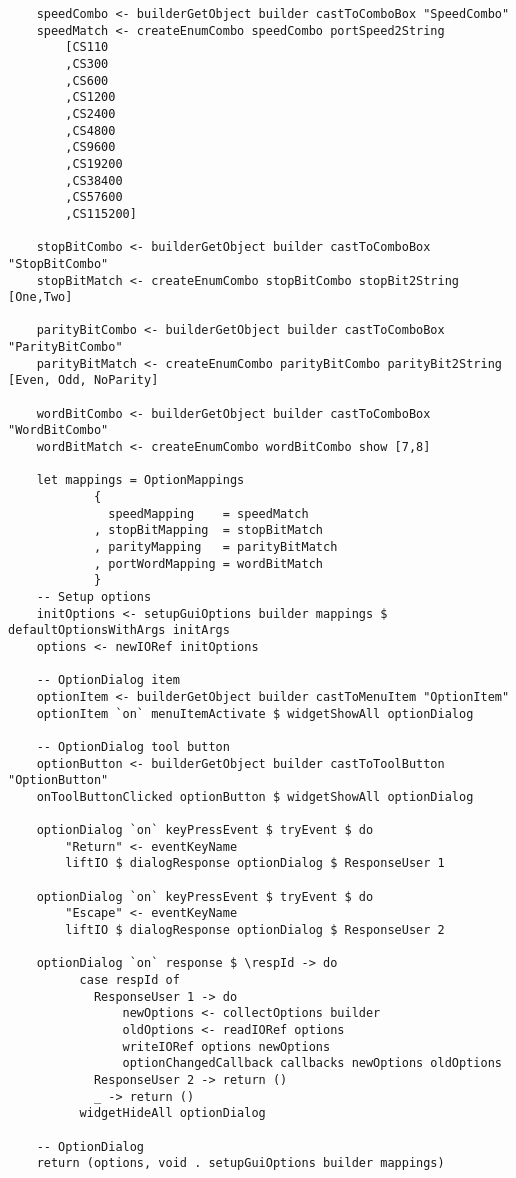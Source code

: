 \documentclass[russian,utf8,simple,emptystyle]{eskdtext}
\begin{document}
\begin{lstlisting}
    speedCombo <- builderGetObject builder castToComboBox "SpeedCombo"
    speedMatch <- createEnumCombo speedCombo portSpeed2String
        [CS110
        ,CS300
        ,CS600
        ,CS1200
        ,CS2400
        ,CS4800
        ,CS9600
        ,CS19200
        ,CS38400
        ,CS57600
        ,CS115200]

    stopBitCombo <- builderGetObject builder castToComboBox "StopBitCombo"
    stopBitMatch <- createEnumCombo stopBitCombo stopBit2String [One,Two]

    parityBitCombo <- builderGetObject builder castToComboBox "ParityBitCombo"
    parityBitMatch <- createEnumCombo parityBitCombo parityBit2String [Even, Odd, NoParity]

    wordBitCombo <- builderGetObject builder castToComboBox "WordBitCombo"
    wordBitMatch <- createEnumCombo wordBitCombo show [7,8]

    let mappings = OptionMappings
            {
              speedMapping    = speedMatch
            , stopBitMapping  = stopBitMatch
            , parityMapping   = parityBitMatch
            , portWordMapping = wordBitMatch
            } 
    -- Setup options
    initOptions <- setupGuiOptions builder mappings $ defaultOptionsWithArgs initArgs
    options <- newIORef initOptions

    -- OptionDialog item
    optionItem <- builderGetObject builder castToMenuItem "OptionItem"
    optionItem `on` menuItemActivate $ widgetShowAll optionDialog

    -- OptionDialog tool button
    optionButton <- builderGetObject builder castToToolButton "OptionButton"
    onToolButtonClicked optionButton $ widgetShowAll optionDialog

    optionDialog `on` keyPressEvent $ tryEvent $ do 
        "Return" <- eventKeyName
        liftIO $ dialogResponse optionDialog $ ResponseUser 1 

    optionDialog `on` keyPressEvent $ tryEvent $ do 
        "Escape" <- eventKeyName 
        liftIO $ dialogResponse optionDialog $ ResponseUser 2 

    optionDialog `on` response $ \respId -> do
          case respId of 
            ResponseUser 1 -> do
                newOptions <- collectOptions builder
                oldOptions <- readIORef options 
                writeIORef options newOptions
                optionChangedCallback callbacks newOptions oldOptions
            ResponseUser 2 -> return ()
            _ -> return ()
          widgetHideAll optionDialog

    -- OptionDialog
    return (options, void . setupGuiOptions builder mappings)
\end{lstlisting}
\end{document}
